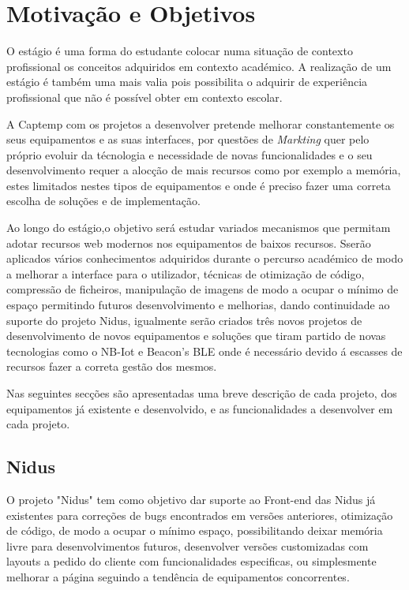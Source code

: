 \section{Motivação e Objetivos}
\par
O estágio é uma forma do estudante colocar numa situação de contexto profissional os conceitos adquiridos em contexto académico. A realização de um estágio é também uma mais valia pois possibilita o adquirir de experiência profissional que não é possível obter em contexto escolar.
\par
A Captemp com os projetos a desenvolver pretende melhorar constantemente os seus equipamentos e as suas interfaces, por questões de \textit{Markting} quer pelo próprio evoluir da técnologia e necessidade de novas funcionalidades e o seu desenvolvimento requer a alocção de mais recursos como por exemplo a memória, estes limitados nestes tipos de equipamentos e onde é preciso fazer uma correta escolha de soluções e de implementação. 
\par
Ao longo do estágio,o objetivo será estudar variados mecanismos que permitam adotar recursos web modernos nos equipamentos de baixos recursos. Sserão aplicados vários conhecimentos adquiridos durante o percurso académico de modo a melhorar a interface para o utilizador, técnicas de otimização de código, compressão de ficheiros, manipulação de imagens de modo a ocupar o mínimo de espaço permitindo futuros desenvolvimento e melhorias, dando continuidade ao suporte do projeto Nidus, igualmente serão criados três novos projetos de desenvolvimento de novos equipamentos e soluções que tiram partido de novas tecnologias como o NB-Iot e Beacon’s BLE onde é necessário devido á escasses de recursos fazer a correta gestão dos mesmos.
\par
Nas seguintes secções são apresentadas uma breve descrição de cada projeto, dos equipamentos já existente e desenvolvido, e as funcionalidades a desenvolver em cada projeto.
\subsection{Nidus}
\par
O projeto "Nidus" tem como objetivo dar suporte ao Front-end das Nidus já existentes para correções de bugs encontrados em versões anteriores, otimização de código, de modo a ocupar o mínimo espaço, possibilitando deixar memória livre para desenvolvimentos futuros, desenvolver versões customizadas com layouts a pedido do cliente com funcionalidades especificas, ou simplesmente melhorar a página seguindo a tendência de equipamentos concorrentes.
